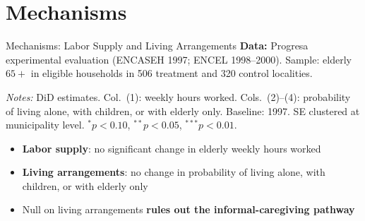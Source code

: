 \documentclass[aspectratio=169,usenames,dvipsnames]{beamer}
\begin{document}

\section{Mechanisms}

\begin{frame}[shrink=15]{Mechanisms: Labor Supply and Living Arrangements}\label{mechanisms_lab}
\vspace{0.3cm}
\small
\textbf{Data:} Progresa experimental evaluation (ENCASEH 1997; ENCEL 1998--2000). Sample: elderly $65+$ in eligible households in 506 treatment and 320 control localities.

\vspace{4pt}
\begin{center}
\begin{table}
  \centering
  \scriptsize
  \begin{threeparttable}
    
    \begin{tablenotes}
      \tiny
      \item \textit{Notes:} DiD estimates. Col.\ (1): weekly hours worked. Cols.\ (2)--(4): probability of living alone, with children, or with elderly only. Baseline: 1997. SE clustered at municipality level. $^{*}p<0.10$, $^{**}p<0.05$, $^{***}p<0.01$.
    \end{tablenotes}
  \end{threeparttable}
\end{table}
\end{center}
\vspace{2pt}

\begin{itemize}
  \item[$\circ$] \textbf{Labor supply}: no significant change in elderly weekly hours worked
  \item[$\circ$] \textbf{Living arrangements}: no change in probability of living alone, with children, or with elderly only
  \item[$\circ$] Null on living arrangements \textbf{rules out the informal-caregiving pathway}
\end{itemize}

\end{frame}
\end{document}
